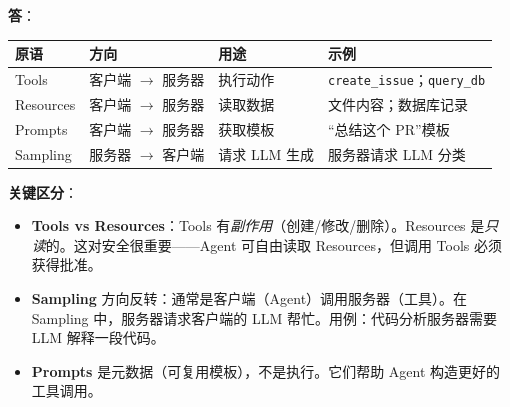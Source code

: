 \begin{questionbox}
\textbf{答}：

\begin{center}
\begin{tabular}{@{}l l l l@{}}
\toprule
\textbf{原语} & \textbf{方向} & \textbf{用途} & \textbf{示例} \\
\midrule
Tools & 客户端 $\to$ 服务器 & 执行动作 & \texttt{create\_issue}；\texttt{query\_db} \\
Resources & 客户端 $\to$ 服务器 & 读取数据 & 文件内容；数据库记录 \\
Prompts & 客户端 $\to$ 服务器 & 获取模板 & “总结这个 PR”模板 \\
Sampling & 服务器 $\to$ 客户端 & 请求 LLM 生成 & 服务器请求 LLM 分类 \\
\bottomrule
\end{tabular}
\end{center}

\textbf{关键区分}：

\begin{itemize}
  \item \textbf{Tools vs Resources}：Tools 有\emph{副作用}（创建/修改/删除）。Resources 是\emph{只读}的。这对安全很重要——Agent 可自由读取 Resources，但调用 Tools 必须获得批准。
  \item \textbf{Sampling} 方向反转：通常是客户端（Agent）调用服务器（工具）。在 Sampling 中，服务器请求客户端的 LLM 帮忙。用例：代码分析服务器需要 LLM 解释一段代码。
  \item \textbf{Prompts} 是元数据（可复用模板），不是执行。它们帮助 Agent 构造更好的工具调用。
\end{itemize}


\end{questionbox}
